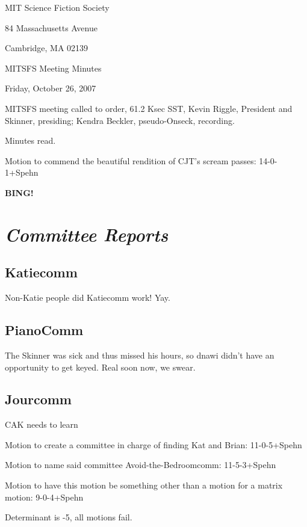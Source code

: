 \documentclass[10pt]{article}
\newcommand{\bing}{{\bf BING!} }
\newcommand{\goto}[1]{\bing \vskip 12pt \section*{{\em{#1}}}}
\begin{document}
\begin{center}

MIT Science Fiction Society

84 Massachusetts Avenue

Cambridge, MA 02139

\vspace{12pt}

MITSFS Meeting Minutes

Friday, October 26, 2007

\end{center}

\vspace{18pt}

\setlength{\parskip}{6pt}

\noindent
MITSFS meeting called to order, 61.2 Ksec SST,
Kevin Riggle, President and Skinner, presiding; Kendra Beckler, pseudo-Onseck, recording.

Minutes read.

Motion to commend the beautiful rendition of CJT's scream passes: 14-0-1+Spehn

\goto{Committee Reports}

\subsection*{Katiecomm}

Non-Katie people did Katiecomm work!  Yay.

\subsection*{PianoComm}

The Skinner was sick and thus missed his hours, so dnawi didn't have an opportunity to get keyed.  Real soon now, we swear.

\subsection*{Jourcomm}

CAK needs to learn 

Motion to create a committee in charge of finding Kat and Brian: 11-0-5+Spehn

Motion to name said committee Avoid-the-Bedroomcomm: 11-5-3+Spehn

Motion to have this motion be something other than a motion for a matrix motion: 9-0-4+Spehn

Determinant is -5, all motions fail.
\end{document}
